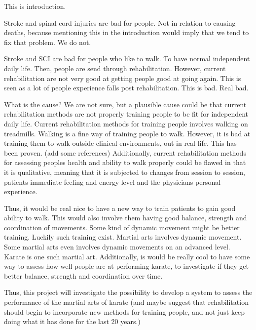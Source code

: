 
This is introduction. 

Stroke and spinal cord injuries are bad for people. Not in relation to causing deaths, because mentioning this in the introduction would imply that we tend to fix that problem. We do not. 

Stroke and SCI are bad for people who like to walk. To have normal independent daily life. Then, people are send through rehabilitation. 
However, current rehabilitation are not very good at getting people good at going again. This is seen as a lot of people experience falls post rehabilitation. This is bad. Real bad.

What is the cause? We are not sure, but a plausible cause could be that current rehabilitation methods are not properly training people to be fit for independent daily life. Current rehabilitation methods for training people involves walking on treadmills. Walking is a fine way of training people to walk. However, it is bad at training them to walk outside clinical environments, out in real life. This has been proven. (add some references)
Additionally, current rehabilitation methods for assessing peoples health and ability to walk properly could be flawed in that it is qualitative, meaning that it is subjected to changes from session to session, patients immediate feeling and energy level and the physicians personal experience. 

Thus, it would be real nice to have a new way to train patients to gain good ability to walk. This would also involve them having good balance, strength and coordination of movements. 
Some kind of dynamic movement might be better training. Luckily such training exist. Martial arts involves dynamic movement. Some martial arts even involves dynamic movements on an advanced level. Karate is one such martial art. 
Additionally, is would be really cool to have some way to assess how well people are at performing karate, to investigate if they get better balance, strength and coordination over time. 

Thus, this project will investigate the possibility to develop a system to assess the performance of the martial arts of karate (and maybe suggest that rehabilitation should begin to incorporate new methods for training people, and not just keep doing what it has done for the last 20 years.)

